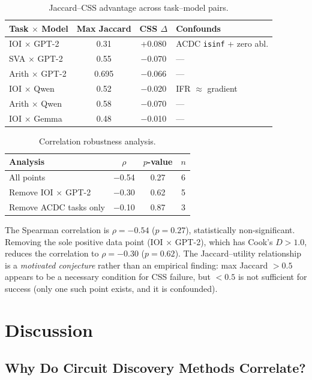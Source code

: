 \documentclass[11pt]{article}
\begin{document}
\begin{table}[h]
\centering
\caption{Jaccard--CSS advantage across task--model pairs.}
\label{tab:correlation_data}
\begin{tabular}{lccl}
\toprule
Task $\times$ Model & Max Jaccard & CSS $\Delta$ & Confounds \\
\midrule
IOI $\times$ GPT-2 & 0.31 & +0.080 & ACDC \texttt{isinf} + zero abl. \\
SVA $\times$ GPT-2 & 0.55 & $-$0.070 & --- \\
Arith $\times$ GPT-2 & 0.695 & $-$0.066 & --- \\
IOI $\times$ Qwen & 0.52 & $-$0.020 & IFR $\approx$ gradient \\
Arith $\times$ Qwen & 0.58 & $-$0.070 & --- \\
IOI $\times$ Gemma & 0.48 & $-$0.010 & --- \\
\bottomrule
\end{tabular}
\end{table}

\begin{table}[h]
\centering
\caption{Correlation robustness analysis.}
\label{tab:correlation_stats}
\begin{tabular}{lccc}
\toprule
Analysis & $\rho$ & $p$-value & $n$ \\
\midrule
All points & $-$0.54 & 0.27 & 6 \\
Remove IOI $\times$ GPT-2 & $-$0.30 & 0.62 & 5 \\
Remove ACDC tasks only & $-$0.10 & 0.87 & 3 \\
\bottomrule
\end{tabular}
\end{table}

The Spearman correlation is $\rho = -0.54$ ($p = 0.27$), statistically non-significant. Removing the sole positive data point (IOI $\times$ GPT-2), which has Cook's $D > 1.0$, reduces the correlation to $\rho = -0.30$ ($p = 0.62$). The Jaccard--utility relationship is a \emph{motivated conjecture} rather than an empirical finding: max Jaccard $> 0.5$ appears to be a necessary condition for CSS failure, but $< 0.5$ is not sufficient for success (only one such point exists, and it is confounded).

\section{Discussion}

\subsection{Why Do Circuit Discovery Methods Correlate?}
\end{document}
